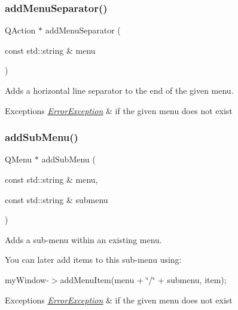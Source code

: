 \subsubsection{\texorpdfstring{add\+Menu\+Separator()}{addMenuSeparator()}}
{\footnotesize\ttfamily Q\+Action $\ast$ add\+Menu\+Separator (\begin{DoxyParamCaption}\item[{const std\+::string \&}]{menu }\end{DoxyParamCaption})\hspace{0.3cm}{\ttfamily [virtual]}}



Adds a horizontal line separator to the end of the given menu. 


\begin{DoxyExceptions}{Exceptions}
{\em \mbox{\hyperlink{classErrorException}{Error\+Exception}}} & if the given menu does not exist \\
\hline
\end{DoxyExceptions}
\mbox{\label{classGWindow_a557f7b2372831420546b73239027d2ae}} 
\subsubsection{\texorpdfstring{add\+Sub\+Menu()}{addSubMenu()}}
{\footnotesize\ttfamily Q\+Menu $\ast$ add\+Sub\+Menu (\begin{DoxyParamCaption}\item[{const std\+::string \&}]{menu,  }\item[{const std\+::string \&}]{submenu }\end{DoxyParamCaption})\hspace{0.3cm}{\ttfamily [virtual]}}



Adds a sub-\/menu within an existing menu. 

You can later add items to this sub-\/menu using\+:

my\+Window-\/$>$add\+Menu\+Item(menu + \char`\"{}/\char`\"{} + submenu, item); 
\begin{DoxyExceptions}{Exceptions}
{\em \mbox{\hyperlink{classErrorException}{Error\+Exception}}} & if the given menu does not exist \\
\hline
\end{DoxyExceptions}
\mbox{\label{classGWindow_aab55413917cdbb2e0560ab415d59fd1f}} 
